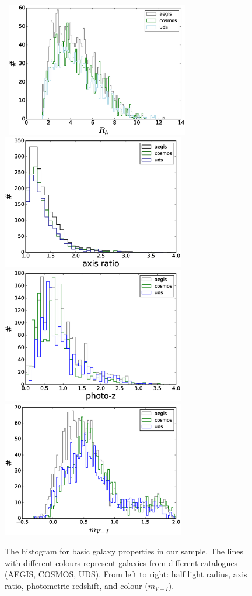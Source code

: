 \documentclass[useAMS,usenatbib]{mnras}
\begin{document}
\begin{figure}
  \hbox{
    \includegraphics[width=8.0cm]{zhisrh.eps}
    \includegraphics[width=8.0cm]{zhisratio.eps}}
    \hbox{
    \includegraphics[width=8.0cm]{zhisphotoz.eps}
    \includegraphics[width=8.0cm]{zhiscolor.eps}}
  \caption{The histogram for basic galaxy properties in our
    sample. The lines with different colours represent galaxies from
    different catalogues (AEGIS, COSMOS, UDS). From left to right: half
    light radius, axis ratio, photometric redshift, and colour
    ($m_{V-I}$).}
  \label{fig:datapro1}
\end{figure}
%
\end{document}
